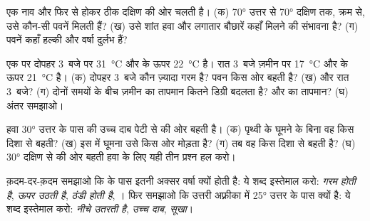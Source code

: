 \begin{exercise}[$\star\star$]\label{exo:g8:winds-global-circulation:6}
एक नाव  और फिर  से होकर ठीक दक्षिण की ओर चलती है।
(क) \ang{70} उत्तर से \ang{70} दक्षिण तक, क्रम से, उसे कौन-सी पवनें मिलती हैं? (ख) उसे शांत
हवा और लगातार बौछारें कहाँ मिलने की संभावना है? (ग) पवनें कहाँ हल्की और वर्षा
दुर्लभ हैं?
\end{exercise}

\begin{exercise}[$\star\star$]\label{exo:g8:winds-global-circulation:7}
एक   पर दोपहर 3~बजे  पर \qty{31}{\degreeCelsius} और  के ऊपर
\qty{22}{\degreeCelsius} है। रात 3~बजे ज़मीन पर \qty{17}{\degreeCelsius} और
 के ऊपर \qty{21}{\degreeCelsius} है। (क) दोपहर 3~बजे कौन ज़्यादा गरम है? पवन
किस ओर बहती है? (ख) और रात 3~बजे? (ग) दोनों समयों के बीच ज़मीन का तापमान कितने
डिग्री बदलता है? और  का तापमान? (घ) अंतर
समझाओ।
\end{exercise}

\begin{exercise}[$\star\star$]\label{exo:g8:winds-global-circulation:8}
हवा \ang{30} उत्तर के पास की उच्च दाब पेटी से  की ओर बहती है। (क) पृथ्वी के
घूमने के बिना वह किस दिशा से बहती? (ख) इस  में घूमना उसे किस ओर मोड़ता है?
(ग) तब वह किस दिशा से बहती है? (घ) \ang{30} दक्षिण से  की ओर बहती हवा के लिए
यही तीन प्रश्न हल
करो।
\end{exercise}

\begin{exercise}[$\star\star$]\label{exo:g8:winds-global-circulation:9}
क़दम-दर-क़दम समझाओ कि  के पास इतनी अक्सर वर्षा क्यों होती है: ये शब्द
इस्तेमाल करो: \emph{गरम होती है}, \emph{ऊपर उठती है}, \emph{ठंडी होती है},
\emph{}। फिर समझाओ कि उत्तरी अफ़्रीका में \ang{25} उत्तर के पास  क्यों है: ये
शब्द इस्तेमाल करो: \emph{नीचे उतरती है}, \emph{उच्च दाब}, \emph{सूखा}।
\end{exercise}

